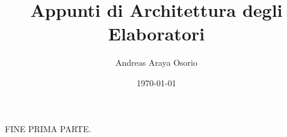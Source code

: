 \documentclass[12pt, a4paper]{report}
\title{Appunti di Architettura degli Elaboratori}
\author{Andreas Araya Osorio}
\date{\today}
\begin{document}
\maketitle

\tableofcontents



{\Huge FINE PRIMA PARTE.}


\end{document}
